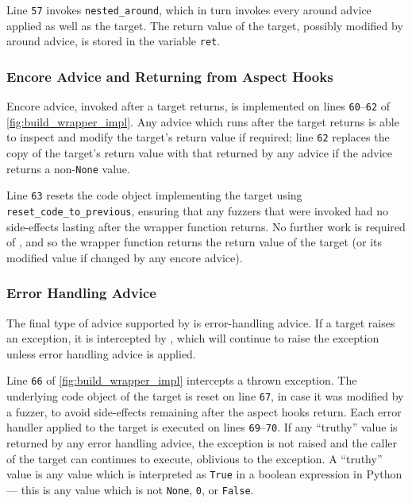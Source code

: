 % 

Line \texttt{57} invokes \lstinline{nested_around}, which in turn invokes every
around advice applied as well as the target. The return value of the target,
possibly modified by around advice, is stored in the variable \lstinline{ret}.


\subsubsection{Encore Advice and Returning from Aspect Hooks}

Encore advice, invoked after a target returns, is implemented on lines
\texttt{60}--\texttt{62} of \cref{fig:build_wrapper_impl}. Any advice
which runs after the target returns is able to inspect and modify the target's
return value if required; line \texttt{62} replaces the copy of the target's
return value with that returned by any advice if the advice returns a
non-\lstinline{None} value.

Line \texttt{63} resets the code object implementing the target using
\lstinline{reset_code_to_previous}, ensuring that any fuzzers that were invoked
had no side-effects lasting after the wrapper function returns. No further work
is required of \pdsfthree{}, and so the wrapper function returns the return value of
the target (or its modified value if changed by any encore advice).


\subsubsection{Error Handling Advice}
\label{error_handling_advice}
The final type of advice supported by \pdsfthree{} is error-handling advice. If a
target raises an exception, it is intercepted by \pdsfthree{}, which will continue to
raise the exception unless error handling advice is applied. 

Line \texttt{66} of \cref{fig:build_wrapper_impl} intercepts a thrown
exception. The underlying code object of the target is reset on line
\texttt{67}, in case it was modified by a fuzzer, to avoid side-effects
remaining after the aspect hooks return. Each error handler applied to the
target is executed on lines \texttt{69}--\texttt{70}. If any ``truthy'' value is
returned by any error handling advice, the exception is not raised and the
caller of the target can continues to execute, oblivious to the exception. A
``truthy'' value is any value which is interpreted as \lstinline{True} in a
boolean expression in Python --- this is any value which is not
\lstinline{None}, \lstinline{0}, or \lstinline{False}.


